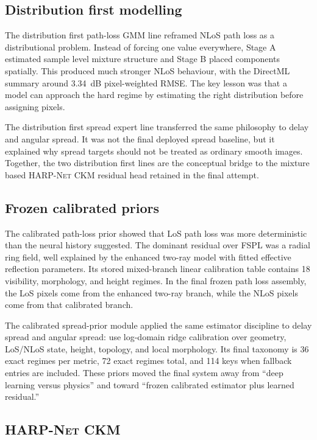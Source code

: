 \subsection{Distribution first modelling}

The distribution first path-loss GMM line reframed NLoS path loss as a
distributional problem. Instead of forcing one value everywhere, Stage A
estimated sample level mixture structure and Stage B placed components
spatially. This produced much stronger NLoS behaviour, with the DirectML
summary around \SI{3.34}{dB} pixel-weighted RMSE. The key lesson was that a
model can approach the hard regime by estimating the right distribution before
assigning pixels.

The distribution first spread expert line transferred the same philosophy to
delay and angular spread. It was
not the final deployed spread baseline, but it explained why spread targets
should not be treated as ordinary smooth images. Together, the two
distribution first lines are the conceptual bridge to the mixture based
\textsc{HARP-Net CKM} residual head retained in the final attempt.

\subsection{Frozen calibrated priors}

The calibrated path-loss prior showed that LoS path loss was more deterministic than the neural
history suggested. The dominant residual over FSPL was a radial ring field,
well explained by the enhanced two-ray model with fitted effective reflection
parameters. Its stored mixed-branch linear calibration table contains 18
visibility, morphology, and height regimes. In the final frozen path loss
assembly, the LoS pixels come from the enhanced two-ray branch, while the
NLoS pixels come from that calibrated branch.

The calibrated spread-prior module applied the same estimator discipline to delay spread and angular
spread: use log-domain ridge calibration over geometry, LoS/NLoS state,
height, topology, and local morphology. Its final taxonomy is 36 exact regimes
per metric, 72 exact regimes total, and 114 keys when fallback entries are
included. These priors moved the final system away from ``deep learning versus
physics'' and toward ``frozen calibrated estimator plus learned residual.''

\subsection{\textsc{HARP-Net CKM}}

